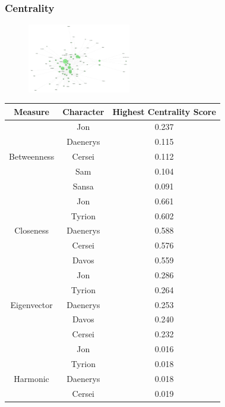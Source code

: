 \documentclass[10pt,twocolumn,letterpaper]{article}
\begin{document}
\subsubsection{Centrality}

\begin{figure}[!h]
    \centering
    \includegraphics[width=0.4\textwidth]{img/s7/pagerank_graph.jpg}
\end{figure}

\begin{table}[!h]
    \centering
    \small
    \begin{tabular}{c|c|c}
        Measure & Character & \small{Highest Centrality Score} \\
        \hline
                    & Jon & 0.237 \\
                    & Daenerys & 0.115 \\
        Betweenness & Cersei & 0.112 \\
                    & Sam & 0.104 \\
                    & Sansa & 0.091 \\
        \hline 
                    & Jon & 0.661 \\
                    & Tyrion & 0.602 \\
        Closeness   & Daenerys & 0.588 \\
                    & Cersei & 0.576 \\
                    & Davos & 0.559 \\
        \hline 
                    & Jon & 0.286 \\
                    & Tyrion & 0.264 \\
        Eigenvector & Daenerys & 0.253 \\
                    & Davos & 0.240 \\
                    & Cersei & 0.232 \\
        \hline 
                    & Jon & 0.016 \\
                    & Tyrion & 0.018 \\
        Harmonic    & Daenerys & 0.018 \\
                    & Cersei & 0.019 \\

\end{tabular}
\end{table}
\end{document}

